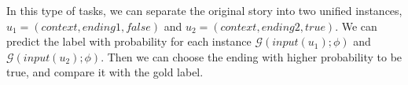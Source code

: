 In this type of tasks,
we can separate the original story into two unified instances, 
$u_1=(context, ending1, false)$ and $u_2=(context, ending2, true)$.
We can predict the label with probability for each instance $\mathcal{G}(input(u_1);\phi)$ and 
 $\mathcal{G}(input(u_2);\phi)$.
Then we can choose the ending with higher probability to be true, 
and compare it with the gold label.

 

